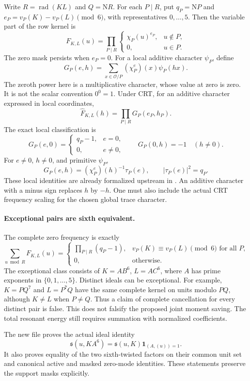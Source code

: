 \documentclass[11pt]{article}
\newcommand{\OO}{\mathcal O}
\newcommand{\Nm}{\mathrm N}
\newcommand{\rad}{\operatorname{rad}}
\begin{document}
Write \(R=\rad(KL)\) and \(Q=\Nm R\).
For each \(P\mid R\), put \(q_P=\Nm P\) and
\(e_P=v_P(K)-v_P(L)\pmod6\), with representatives \(0,\ldots,5\).
Then the variable part of the row kernel is
\[
 F_{K,L}(u)=\prod_{P\mid R}
 \begin{cases}
  \chi_P(u)^{e_P},&u\notin P,\\
  0,&u\in P.
 \end{cases}
\]
The zero mask persists when \(e_P=0\).
For a local additive character \(\psi_P\), define
\[
 G_P(e,h)=\sum_{x\in\OO/P}(\chi_P^e)(x)\psi_P(hx).
\]
The zeroth power here is a multiplicative character, whose value at
zero is zero. It is not the scalar convention \(0^0=1\).
Under CRT, for an additive character expressed in local coordinates,
\[
 \widehat F_{K,L}(h)=\prod_{P\mid R}G_P(e_P,h_P).
\]
The exact local classification is
\[
 G_P(e,0)=
 \begin{cases}q_P-1,&e=0,\\0,&e\ne0,\end{cases}
 \qquad
 G_P(0,h)=-1\quad(h\ne0).
\]
For \(e\ne0\), \(h\ne0\), and primitive \(\psi_P\),
\[
 G_P(e,h)=(\chi_P^e)(h)^{-1}\tau_P(e),
 \qquad |\tau_P(e)|^2=q_P.
\]
These local identities are already formalized upstream in
.
An additive character with a minus sign replaces \(h\) by \(-h\).
One must also include the actual CRT frequency scaling for the
chosen global trace character.

\paragraph{Exceptional pairs are sixth equivalent.}
The complete zero frequency is exactly
\[
 \sum_{u\bmod R}F_{K,L}(u)=
 \begin{cases}
  \prod_{P\mid R}(q_P-1),&v_P(K)\equiv v_P(L)\pmod6\text{ for all }P,\\
  0,&\text{otherwise}.
 \end{cases}
\]
The exceptional class consists of
\(K=A B^6\), \(L=A C^6\), where \(A\) has prime exponents in
\(\{0,1,\ldots,5\}\). Distinct ideals can be exceptional.
For example, \(K=P Q^7\) and \(L=P^7Q\) have the same complete
kernel on units modulo \(PQ\), although \(K\ne L\) when \(P\ne Q\).
Thus a claim of complete cancellation for every distinct pair is false.
This does not falsify the proposed joint moment saving. The total
resonant energy still requires summation with normalized coefficients.

The new file  proves the
actual ideal identity
\[
 \mathfrak s(u,K A^6)=\mathfrak s(u,K)
          \mathbf 1_{(A,(u))=1}.
\]
It also proves equality of the two sixth-twisted factors on their
common unit set and canonical active and masked zero-mode identities.
These statements preserve the support masks explicitly.
\end{document}
